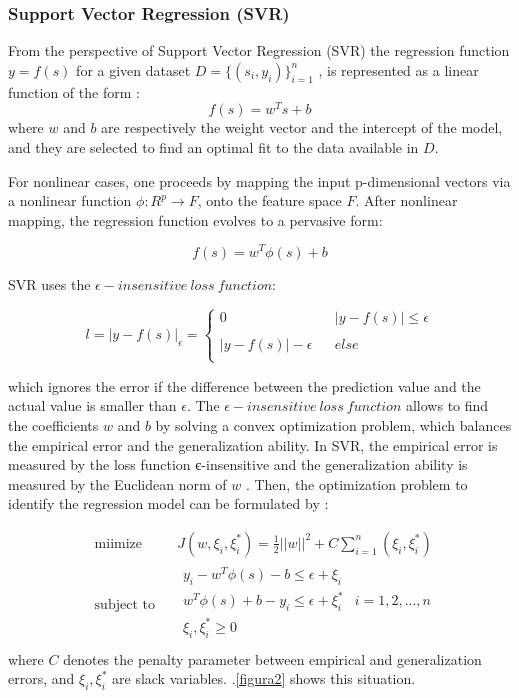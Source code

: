\documentclass[review]{elsarticle}
\begin{document}
\subsubsection{Support Vector Regression (SVR)}
From the perspective of Support Vector Regression (SVR) the regression function $y = f(s)$ for a given dataset $D=\{(s_i,y_i)\}_{i=1}^n$ , is represented as a linear function of the form \citep{Wei2013}:
$$f(s)=w^Ts+b$$
where $w$ and $b$ are respectively the weight vector and the intercept of the model, and they are selected to find an optimal fit to the data available in $D$.

For nonlinear cases, one proceeds by mapping the input p-dimensional vectors via a nonlinear function $\phi : R^p\rightarrow F$, onto the feature space $F$.  After nonlinear mapping, the regression function evolves to a pervasive form:

$$f(s)=w^T \phi (s)+b$$

SVR uses the $ \epsilon -insensitive \ loss \ function$:

\[l= {\Bigr| y - f(s) \Bigr| }_{\epsilon } = 
\left\{\begin{array}{lcl}
	0 & \mbox{} & {\Bigr| y - f(s) \Bigr| } \leq \epsilon \\
	 &  & \\
	{\Bigr| y - f(s) \Bigr| - \epsilon} & \mbox{} & else\\ \end{array} \right. \] 

which ignores the error if the difference between the prediction value and the actual value is smaller than $ \epsilon$.
The $ \epsilon -insensitive \ loss \ function$ allows to find the coefficients $w$ and $b$ by solving a convex optimization problem, which balances the empirical error and the generalization ability. In SVR, the empirical error is measured by the loss function є-insensitive and the generalization ability is measured by the Euclidean norm of $w$ \citep{XXXX201X}. Then, the optimization problem to identify the regression model can be formulated by \citep{Wei2013}:

\begin{equation} 
\begin{aligned}
& \underset{}{\text{miimize}}
& & J(w,\xi_i , \xi_i^* ) = \frac{1}{2}   \Bigr| \Bigr| w \Bigr| \Bigr|^2 + C \sum_{i=1}^{n} (\xi_i , \xi_i^* )    \\
& \text{subject to}
& & \begin{array}{lcl} 
y_i - w^T \phi (s) - b  \leq \epsilon + \xi_i   \\
w^T \phi (s) + b - y_i \leq \epsilon + \xi_i^* & i= 1,2,...,n \\
\xi_i , \xi_i^* \geq 0  \\
\end{array}
\end{aligned}
\end{equation}  
where $C$ denotes the penalty parameter between empirical and generalization errors, and  $\xi_i , \xi_i^*$ are slack variables. \figurename
$.$\ref{figura2} shows this situation.
\end{document}
